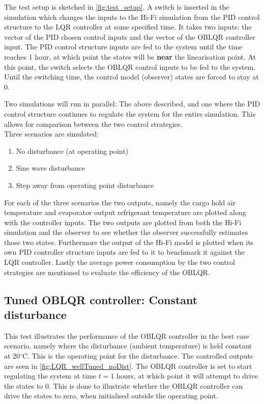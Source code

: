 The test setup is sketched in \cref{fig:test_setup}. A switch is inserted in the simulation which changes the inputs to the Hi-Fi simulation from the PID control structure to the LQR controller at some specified time. It takes two inputs: the vector of the PID chosen control inputs and the vector of the OBLQR controller input. The PID control structure inputs are fed to the system until the time reaches 1 hour, at which point the states will be \textbf{near} the linearisation point. At this point, the switch selects the OBLQR control inputs to be fed to the system. Until the switching time, the control model (observer) states are forced to stay at 0.

Two simulations will run in parallel: The above described, and one where the PID control structure continues to regulate the system for the entire simulation. This allows for comparison between the two control strategies.\\

Three scenarios are simulated:

\begin{enumerate}
	\item No disturbance (at operating point)
	\item Sine wave disturbance
	\item Step away from operating point disturbance
\end{enumerate}

\noindent For each of the three scenarios the two outputs, namely the cargo hold air temperature and evaporator output refrigerant temperature are plotted along with the controller inputs. The two outputs are plotted from both the Hi-Fi simulation and the observer to see whether the observer successfully estimates those two states. Furthermore the output of the Hi-Fi model is plotted when its own PID controller structure inputs are fed to it to benchmark it against the LQR controller. Lastly the average power consumption by the two control strategies are mentioned to evaluate the efficiency of the OBLQR.

\subsection{Tuned OBLQR controller: Constant disturbance}
This test illustrates the performance of the OBLQR controller in the best case scenario, namely where the disturbance (ambient temperature) is held constant at 20$^{\circ}$C. This is the operating point for the disturbance. The controlled outputs are seen in \cref{fig:LQR_wellTuned_noDist}. The OBLQR controller is set to start regulating the system at time $t=1$ hours, at which point it will attempt to drive the states to 0. This is done to illustrate whether the OBLQR controller can drive the states to zero, when initialised outside the operating point.

